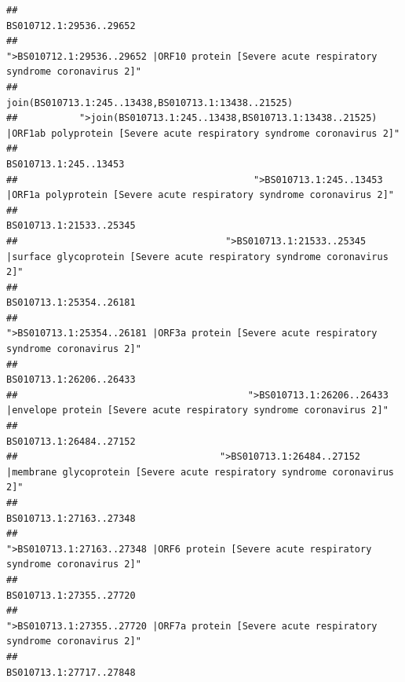 \documentclass[
]{article}
\begin{document}
\begin{verbatim}
##                                                                                                                BS010712.1:29536..29652 
##                                            ">BS010712.1:29536..29652 |ORF10 protein [Severe acute respiratory syndrome coronavirus 2]" 
##                                                                                    join(BS010713.1:245..13438,BS010713.1:13438..21525) 
##           ">join(BS010713.1:245..13438,BS010713.1:13438..21525) |ORF1ab polyprotein [Severe acute respiratory syndrome coronavirus 2]" 
##                                                                                                                  BS010713.1:245..13453 
##                                          ">BS010713.1:245..13453 |ORF1a polyprotein [Severe acute respiratory syndrome coronavirus 2]" 
##                                                                                                                BS010713.1:21533..25345 
##                                     ">BS010713.1:21533..25345 |surface glycoprotein [Severe acute respiratory syndrome coronavirus 2]" 
##                                                                                                                BS010713.1:25354..26181 
##                                            ">BS010713.1:25354..26181 |ORF3a protein [Severe acute respiratory syndrome coronavirus 2]" 
##                                                                                                                BS010713.1:26206..26433 
##                                         ">BS010713.1:26206..26433 |envelope protein [Severe acute respiratory syndrome coronavirus 2]" 
##                                                                                                                BS010713.1:26484..27152 
##                                    ">BS010713.1:26484..27152 |membrane glycoprotein [Severe acute respiratory syndrome coronavirus 2]" 
##                                                                                                                BS010713.1:27163..27348 
##                                             ">BS010713.1:27163..27348 |ORF6 protein [Severe acute respiratory syndrome coronavirus 2]" 
##                                                                                                                BS010713.1:27355..27720 
##                                            ">BS010713.1:27355..27720 |ORF7a protein [Severe acute respiratory syndrome coronavirus 2]" 
##                                                                                                                BS010713.1:27717..27848 

\end{verbatim}
\end{document}
